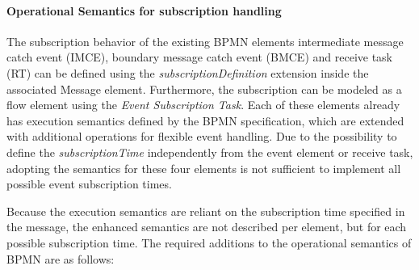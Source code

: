 \paragraph{Operational Semantics for subscription handling}
The subscription behavior of the existing BPMN elements intermediate message catch event (IMCE), boundary message catch event (BMCE) and receive task (RT) can be defined using the \textit{subscriptionDefinition} extension inside the associated Message element.
Furthermore, the subscription can be modeled as a flow element using the \textit{Event Subscription Task}.
Each of these elements already has execution semantics defined by the BPMN specification, which are extended with additional operations for flexible event handling.
Due to the possibility to define the \textit{subscriptionTime} independently from the event element or receive task, adopting the semantics for these four elements is not sufficient to implement all possible event subscription times.

Because the execution semantics are reliant on the subscription time specified in the message, the enhanced semantics are not described per element, but for each possible subscription time.
The required additions to the operational semantics of BPMN are as follows:

